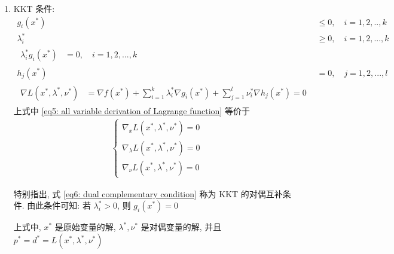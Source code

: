 \documentclass[oneside, 12pt]{ctexbook}
\begin{document}
\begin{enumerate}
					 \item KKT 条件:
					 	\begin{align}
					 		g_i(x^*) &\leq 0, \quad i=1,2,..,k 
					 		\\
					 		\lambda_i^* &\geq 0, \quad i=1,2,...,k 
					 		\\
					 		\begin{split}
					 			\lambda_i^* g_i(x^*) &= 0, \quad i=1,2,...,k
					 		\end{split} \label{eq6: dual complementary condition}
					 		 \\
					 		h_j(x^*) &= 0, \quad j=1,2,...,l 
					 		\\
					 		\begin{split}
					 			\nabla L(x^*, \lambda^*, \nu^*) &= \nabla f(x^*) + \sum_{i=1}^{k} \lambda_i^* \nabla g_i(x^*) + \sum_{j=1}^{l} \nu_i^* \nabla h_j (x^*) = 0 
					 		\end{split} \label{eq5: all variable derivation of Lagrange function}
					 	\end{align}
					 	上式中 \ref{eq5: all variable derivation of Lagrange function} 等价于
					 	\begin{align}
					 		\left\{
					 			\begin{matrix}
					 				\nabla_x L(x^*, \lambda^*, \nu^*) = 0 \\
					 				\nabla_\lambda L(x^*, \lambda^*, \nu^*) = 0 \\
					 				\nabla_\nu L(x^*, \lambda^*, \nu^*) = 0
					 			\end{matrix}
					 		\right.
					 	\end{align}
					 	
					 	特别指出, 式 \ref{eq6: dual complementary condition} 称为 KKT 的对偶互补条件. 由此条件可知: 若 $\lambda_i^* > 0$, 则 $g_i(x^*) = 0$
					 	
					 	上式中, $x^*$ 是原始变量的解, $\lambda^*, \nu^*$ 是对偶变量的解, 并且 $p^* = d^* = L(x^*, \lambda^*, \nu^*)$
					 	

\end{enumerate}
\end{document}

